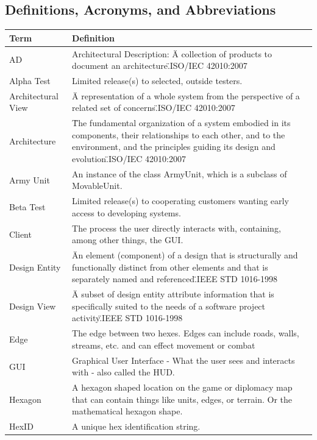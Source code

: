 \documentclass[12pt,a4paper,titlepage]{article}
\begin{document}
\subsection{Definitions, Acronyms, and Abbreviations}
\small{
\begin{center}
\keepXColumns
\noindent\begin{tabularx}{\linewidth}{|p{1.5in}|X|}\hline
\textbf{Term} & \textbf{Definition}\\
\hline
AD & Architectural Description: \"A collection of products to document an architecture.\"\space ISO/IEC 42010:2007\\
\hline
Alpha Test & Limited release(s) to selected, outside testers.\\
\hline
Architectural View & \"A representation of a whole system from the perspective of a related set of concerns.\"\space ISO/IEC 42010:2007\\
\hline
Architecture & \"The fundamental organization of a system embodied in its components, their relationships to each other, and to the environment, and the principles guiding its design and evolution.\"\space ISO/IEC 42010:2007\\
\hline
Army Unit & An instance of the class ArmyUnit, which is a subclass of MovableUnit.\\
\hline
Beta Test & Limited release(s) to cooperating customers wanting early access to developing systems.\\
\hline
Client & The process the user directly interacts with, containing, among other things, the GUI.\\
\hline
Design Entity & \"An element (component) of a design that is structurally and functionally distinct from other elements and that is separately named and referenced.\"\space IEEE STD 1016-1998\\
\hline
Design View & \"A subset of design entity attribute information that is specifically suited to the needs of a software project activity.\"\space IEEE STD 1016-1998\\
\hline
Edge & The edge between two hexes. Edges can include roads, walls, streams, etc. and can effect movement or combat\\
\hline
GUI & Graphical User Interface - What the user sees and interacts with - also called the HUD.\\
\hline
Hexagon & A hexagon shaped location on the game or diplomacy map that can contain things like units, edges, or terrain. Or the mathematical hexagon shape.\\
\hline
HexID & A unique hex identification string.\\

\end{tabularx}
\end{center}}
\end{document}
